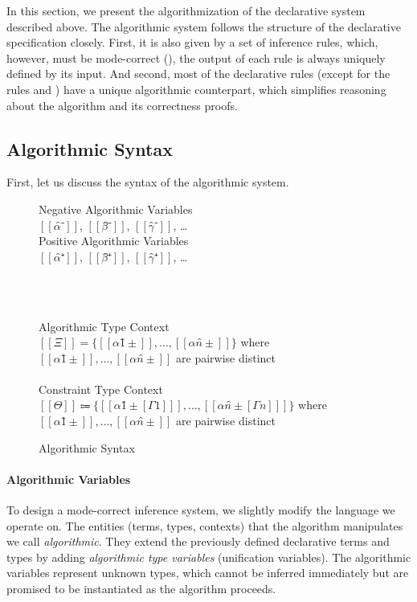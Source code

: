 \label{sec:algorithm}

In this section, we present the algorithmization of the declarative system described above.
The algorithmic system follows the structure of the declarative specification closely.
First, it is also given by a set of inference rules, which, however,
must be mode-correct (\cite{dunfield2020:bidirectional}), \ie
the output of each rule is always uniquely defined by its input.
And second, most of the declarative rules 
(except for the rules  and )
have a unique algorithmic counterpart, 
which simplifies reasoning about the algorithm and its correctness proofs.


\subsection{Algorithmic Syntax}
\label{sec:algo-syntax}

First, let us discuss the syntax of the algorithmic system. 

\begin{figure}[h]
  \begin{multicols}{2}
      Negative Algorithmic Variables\\
      $[[α̂⁻]]$, $[[β̂⁻]]$, $[[γ̂⁻]]$, \dots\\
      \columnbreak
      Positive Algorithmic Variables\\
      $[[α̂⁺]]$, $[[β̂⁺]]$, $[[γ̂⁺]]$, \dots\\
  \end{multicols}
  \hfill\\
  \begin{multicols}{2}
      \ottuNShort
      \columnbreak
      \ottuPShort
  \end{multicols}
  \hfill\\
  Algorithmic Type Context\\
   $[[Ξ]] = \{[[α1̂±]], \dots, [[αn̂±]]\}$ where $[[α1̂±]], \dots, [[αn̂±]]$ are pairwise distinct \\
  \hfill\\
  Constraint Type Context\\
   $[[Θ]] \Coloneqq \{[[ α1̂±[Γ1] ]], \dots, [[ αn̂±[Γn] ]]\}$ where $[[α1̂±]], \dots, [[αn̂±]]$ are pairwise distinct \\
  \caption{Algorithmic Syntax}
  \label{fig:algo-syntax}
\end{figure}

\paragraph{Algorithmic Variables}
To design a mode-correct inference system, we slightly modify the language we operate on.
The entities (terms, types, contexts) that the algorithm manipulates we call \emph{algorithmic}. 
They extend the previously defined declarative terms and types by adding 
\emph{algorithmic type variables} (\aka unification variables). 
The algorithmic variables represent unknown types, 
which cannot be inferred immediately but are promised to be instantiated
as the algorithm proceeds.


